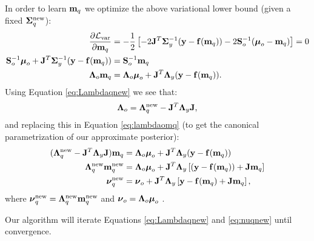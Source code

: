 %
In order to learn $\mathbf{m}_{q}$ we optimize the above variational lower bound (given a fixed ${\mathbf{\Sigma}_{q}^{\text{new}}}$):
\begin{align}
	\deriv{\lvar}{\mq} 
	&= - \frac{1}{2}
	\left[ -2 \J^{T} \Sigmay^{-1} (\vecy - \fmq) -2 \Sigmao^{-1}(\muo - \mq) \right] = 0 \\
	\Sigmao^{-1}\muo + \J^{T} \Sigmay^{-1} (\vecy - \fmq) &= \Sigmao^{-1} \mq \\
	\label{eq:lambdaomq}
	\Lambdao \mq &= \Lambdao \muo +  \J^{T} \Lambday (\vecy - \fmq) \text{.}
\end{align}
Using Equation \eqref{eq:Lambdaqnew} we see that:
\begin{align}
	\mathbf{\Lambda}_{o}  = \mathbf{\Lambda}_{q}^{\text{new}}  -  \mathbf{J}^{T} \mathbf{\Lambda}_{y} \mathbf{J}  \text{,}
\end{align}
and replacing this in Equation \eqref{eq:lambdaomq} (to get the canonical parametrization of our approximate posterior):
\begin{align}
	(\Lambdaqnew  -  \J^{T} \Lambday \J ) \mq &= \Lambdao \muo +  \J^{T} \Lambday (\vecy - \fmq) \\
	\Lambdaqnew \mqnew & = \Lambdao \muo  + \J^{T} \Lambday\left[ (\vecy - \fmq) + \J \mq \right] \\
	\label{eq:nuqnew}
	\nuqnew & = \nuo +  \J^{T} \Lambday\left[ \vecy - \fmq + \J \mq \right] \text{,}
\end{align}
where $\boldsymbol{ \nu }_{q}^{\text{new}} = \mathbf{\Lambda}_{q}^{\text{new}} \mathbf{m}_{q}^{\text{new}}$ and $\boldsymbol{ \nu }_{o} = \mathbf{\Lambda}_{o} \boldsymbol{ \mu }_{o}$ .

Our algorithm will iterate Equations \eqref{eq:Lambdaqnew} and \eqref{eq:nuqnew} until convergence.
%
